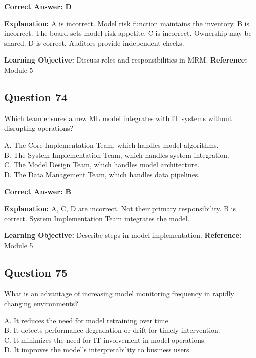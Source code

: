 \documentclass[11pt]{article}
\begin{document}
	\vspace{0.4em}
	\textbf{Correct Answer: D}
	
	\textbf{Explanation:}
	A is incorrect. Model risk function maintains the inventory.
	B is incorrect. The board sets model risk appetite.
	C is incorrect. Ownership may be shared.
	D is correct. Auditors provide independent checks.
	
	\textbf{Learning Objective:} Discuss roles and responsibilities in MRM.
	\textbf{Reference:} Module 5
	
	\subsection*{Question 74}
	Which team ensures a new ML model integrates with IT systems without
	disrupting operations?
	
	A. The Core Implementation Team, which handles model algorithms.\\
	B. The System Implementation Team, which handles system integration.\\
	C. The Model Design Team, which handles model architecture.\\
	D. The Data Management Team, which handles data pipelines.
	
	\vspace{0.4em}
	\textbf{Correct Answer: B}
	
	\textbf{Explanation:}
	A, C, D are incorrect. Not their primary responsibility.
	B is correct. System Implementation Team integrates the model.
	
	\textbf{Learning Objective:} Describe steps in model implementation.
	\textbf{Reference:} Module 5
	
	\subsection*{Question 75}
	What is an advantage of increasing model monitoring frequency in rapidly
	changing environments?
	
	A. It reduces the need for model retraining over time.\\
	B. It detects performance degradation or drift for timely intervention.\\
	C. It minimizes the need for IT involvement in model operations.\\
	D. It improves the model's interpretability to business users.
	
\end{document}
